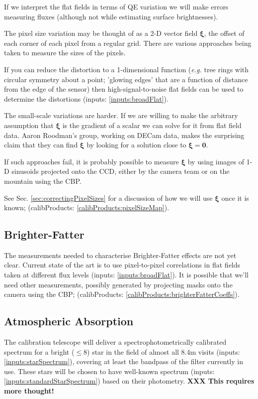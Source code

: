 \documentclass[12pt]{article}
\newcommand{\eg}{\textit{e.g.}\xspace}
\newcommand{\xib}{{\boldsymbol \xi}}
\newcommand{\zerob}{{\boldsymbol 0}}
\newcommand{\inputData}[1]{(inputs: \ref{inputs:#1})}
\newcommand{\outputData}[1]{(calibProducts: \ref{calibProducts:#1})}
\newcommand{\XXX}[1]{\textbf{XXX #1}\xspace}
\newcommand{\secRef}[1]{Sec. \ref{sec:#1}}
\begin{document}
If we interpret the flat fields in terms of QE variation we will make errors measuring fluxes (although
not while estimating surface brightnesses).

The pixel size variation may be thought of as a 2-D vector field $\xib$, the offset of each corner of each
pixel from a regular grid. There are various approaches being taken to measure the sizes of the pixels.

If you can reduce the distortion
to a 1-dimensional function (\eg tree rings with circular symmetry about a point; 'glowing edges' that are
a function of distance from the edge of the sensor) then high-signal-to-noise flat fields can be used to
determine the distortions \inputData{broadFlat}.

The small-scale variations are harder.  If we are willing to make the arbitrary assumption that $\xib$ is the
gradient of a scalar we can solve for it from flat field data.  Aaron Roodman's group, working on DECam data,
makes the surprising claim that they can find $\xib$ by looking for a solution close to $\xib = \zerob$.

If such approaches fail, it is probably possible to measure $\xib$ by using images of 1-D sinusoids projected
onto the CCD, either by the camera team or on the mountain using the CBP.

See \secRef{correctingPixelSizes} for a discussion of how we will use $\xib$ once it is known;
\outputData{pixelSizeMap}.

\subsection{Brighter-Fatter}
\label{sec:brighterFatter}

The measurements needed to characterise Brighter-Fatter effects are not yet clear.  Current state of the art
is to use pixel-to-pixel correlations in flat fields taken at different flux levels \inputData{broadFlat}.  It
is possible that we'll need other measurements, possibly generated by projecting masks onto the camera using
the CBP;  \outputData{brighterFatterCoeffs}.

\subsection{Atmospheric Absorption}

The calibration telescope will deliver a spectrophotometrically calibrated spectrum for a bright ($\le 8$)
star in the field of almost all 8.4m visits \inputData{starSpectrum}, covering at least the bandpass of the
filter currently in use.  These stars will be chosen to have well-known spectrum
\inputData{standardStarSpectrum} based on their photometry. \XXX{This requires more thought!}
\end{document}
